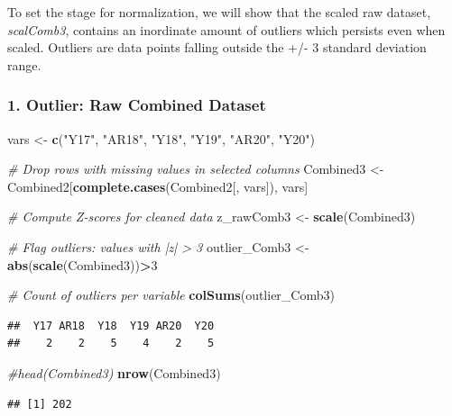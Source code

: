 \documentclass[
]{article}
\newenvironment{Shaded}{\begin{snugshade}}{\end{snugshade}}
\newcommand{\CommentTok}[1]{\textcolor[rgb]{0.56,0.35,0.01}{\textit{#1}}}
\newcommand{\DecValTok}[1]{\textcolor[rgb]{0.00,0.00,0.81}{#1}}
\newcommand{\FunctionTok}[1]{\textcolor[rgb]{0.13,0.29,0.53}{\textbf{#1}}}
\newcommand{\NormalTok}[1]{#1}
\newcommand{\OtherTok}[1]{\textcolor[rgb]{0.56,0.35,0.01}{#1}}
\newcommand{\SpecialCharTok}[1]{\textcolor[rgb]{0.81,0.36,0.00}{\textbf{#1}}}
\newcommand{\StringTok}[1]{\textcolor[rgb]{0.31,0.60,0.02}{#1}}
\begin{document}
To set the stage for normalization, we will show that the scaled raw
dataset, \emph{scalComb3}, contains an inordinate amount of outliers
which persists even when scaled. Outliers are data points falling
outside the +/- 3 standard deviation range.

\subsubsection{1. Outlier: Raw Combined
Dataset}\label{outlier-raw-combined-dataset}

\begin{Shaded}
\begin{Highlighting}[]
\NormalTok{vars }\OtherTok{\textless{}{-}} \FunctionTok{c}\NormalTok{(}\StringTok{"Y17"}\NormalTok{, }\StringTok{"AR18"}\NormalTok{, }\StringTok{"Y18"}\NormalTok{, }\StringTok{"Y19"}\NormalTok{, }\StringTok{"AR20"}\NormalTok{, }\StringTok{"Y20"}\NormalTok{)}

\CommentTok{\# Drop rows with missing values in selected columns}
\NormalTok{Combined3 }\OtherTok{\textless{}{-}}\NormalTok{ Combined2[}\FunctionTok{complete.cases}\NormalTok{(Combined2[, vars]), vars]}

\CommentTok{\# Compute Z{-}scores for cleaned data}
\NormalTok{z\_rawComb3 }\OtherTok{\textless{}{-}} \FunctionTok{scale}\NormalTok{(Combined3)}

\CommentTok{\# Flag outliers: values with |z| \textgreater{} 3}
\NormalTok{outlier\_Comb3 }\OtherTok{\textless{}{-}} \FunctionTok{abs}\NormalTok{(}\FunctionTok{scale}\NormalTok{(Combined3))}\SpecialCharTok{\textgreater{}}\DecValTok{3}

\CommentTok{\# Count of outliers per variable}
\FunctionTok{colSums}\NormalTok{(outlier\_Comb3)}
\end{Highlighting}
\end{Shaded}

\begin{verbatim}
##  Y17 AR18  Y18  Y19 AR20  Y20 
##    2    2    5    4    2    5
\end{verbatim}

\begin{Shaded}
\begin{Highlighting}[]
\CommentTok{\#head(Combined3)}
\FunctionTok{nrow}\NormalTok{(Combined3)}
\end{Highlighting}
\end{Shaded}

\begin{verbatim}
## [1] 202
\end{verbatim}
\end{document}
